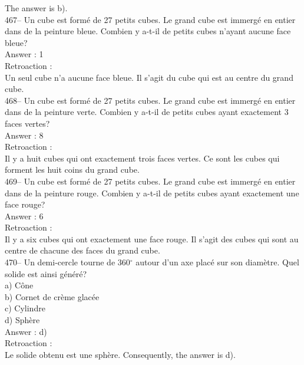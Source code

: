 ﻿\documentclass[letterpaper, 12pt]{article}
\begin{document}
The answer is b).\\

467-- Un cube est form\'e de 27 petits cubes.  Le grand cube est immerg\'e
en entier dans de la peinture bleue.  Combien y a-t-il de petits cubes
n'ayant aucune face bleue?\\

Answer : 1\\

Retroaction : \\
Un seul cube n'a aucune face bleue.  Il s'agit du cube qui est au centre du
grand cube.\\

468-- Un cube est form\'e de 27 petits cubes.  Le grand cube est immerg\'e
en entier dans de la peinture verte.  Combien y a-t-il de petits cubes ayant
exactement 3 faces vertes?\\

Answer : 8\\

Retroaction : \\
Il y a huit cubes qui ont exactement trois faces vertes.  Ce sont les
cubes qui forment les huit coins du grand cube. \\

469-- Un cube est form\'e de 27 petits cubes.  Le grand cube est immerg\'e
en entier dans de la peinture rouge.  Combien y a-t-il de petits cubes ayant
exactement une face rouge?\\

Answer : 6\\

Retroaction : \\
Il y a six cubes qui ont exactement une face rouge.  Il s'agit des cubes qui
sont au centre de chacune des faces du grand cube.  \\


470-- Un demi-cercle tourne de 360$^{\circ}$ autour d'un axe plac\'e sur son
diam\`etre.  Quel solide est ainsi g\'en\'er\'e?\\
a) C\^one\\
b) Cornet de cr\`eme glac\'ee\\
c) Cylindre\\
d) Sph\`ere\\

Answer : d)\\

Retroaction : \\
Le solide obtenu est une sph\`ere.  Consequently, the answer is d).\\
\end{document}
